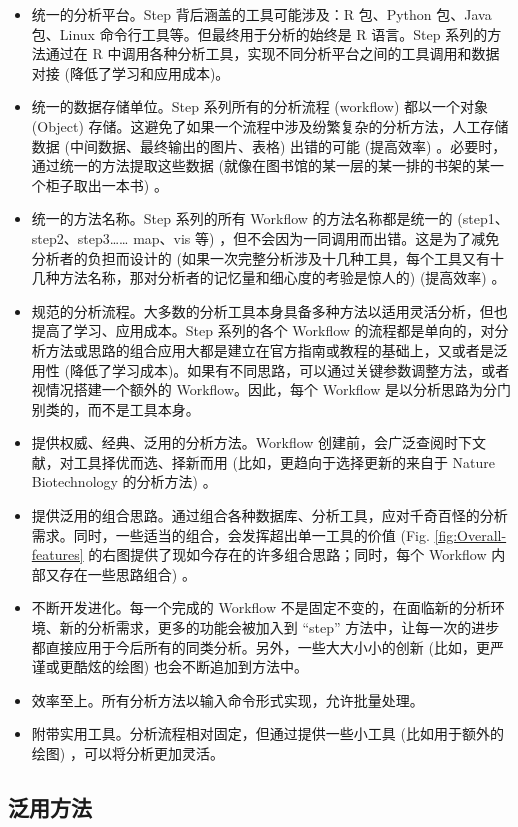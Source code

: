 \documentclass[
]{article}
\begin{document}
\begin{itemize}
\item
  统一的分析平台。Step 背后涵盖的工具可能涉及：R 包、Python 包、Java 包、Linux 命令行工具等。但最终用于分析的始终是 R 语言。Step 系列的方法通过在 R 中调用各种分析工具，实现不同分析平台之间的工具调用和数据对接 (降低了学习和应用成本)。
\item
  统一的数据存储单位。Step 系列所有的分析流程 (workflow) 都以一个对象 (Object) 存储。这避免了如果一个流程中涉及纷繁复杂的分析方法，人工存储数据 (中间数据、最终输出的图片、表格) 出错的可能 (提高效率) 。必要时，通过统一的方法提取这些数据 (就像在图书馆的某一层的某一排的书架的某一个柜子取出一本书) 。
\item
  统一的方法名称。Step 系列的所有 Workflow 的方法名称都是统一的 (step1、step2、step3\ldots\ldots{} map、vis 等) ，但不会因为一同调用而出错。这是为了减免分析者的负担而设计的 (如果一次完整分析涉及十几种工具，每个工具又有十几种方法名称，那对分析者的记忆量和细心度的考验是惊人的) (提高效率) 。
\item
  规范的分析流程。大多数的分析工具本身具备多种方法以适用灵活分析，但也提高了学习、应用成本。Step 系列的各个 Workflow 的流程都是单向的，对分析方法或思路的组合应用大都是建立在官方指南或教程的基础上，又或者是泛用性 (降低了学习成本)。如果有不同思路，可以通过关键参数调整方法，或者视情况搭建一个额外的 Workflow。因此，每个 Workflow 是以分析思路为分门别类的，而不是工具本身。
\item
  提供权威、经典、泛用的分析方法。Workflow 创建前，会广泛查阅时下文献，对工具择优而选、择新而用 (比如，更趋向于选择更新的来自于 Nature Biotechnology 的分析方法) 。
\item
  提供泛用的组合思路。通过组合各种数据库、分析工具，应对千奇百怪的分析需求。同时，一些适当的组合，会发挥超出单一工具的价值 (Fig. \ref{fig:Overall-features} 的右图提供了现如今存在的许多组合思路；同时，每个 Workflow 内部又存在一些思路组合) 。
\item
  不断开发进化。每一个完成的 Workflow 不是固定不变的，在面临新的分析环境、新的分析需求，更多的功能会被加入到 ``step'' 方法中，让每一次的进步都直接应用于今后所有的同类分析。另外，一些大大小小的创新 (比如，更严谨或更酷炫的绘图) 也会不断追加到方法中。
\item
  效率至上。所有分析方法以输入命令形式实现，允许批量处理。
\item
  附带实用工具。分析流程相对固定，但通过提供一些小工具 (比如用于额外的绘图) ，可以将分析更加灵活。
\end{itemize}

\hypertarget{ux6cdbux7528ux65b9ux6cd5}{%
\subsection{泛用方法}\label{ux6cdbux7528ux65b9ux6cd5}}
\end{document}
